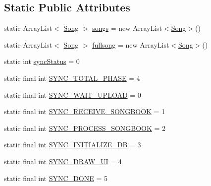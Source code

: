 \subsection*{\-Static \-Public \-Attributes}
\begin{DoxyCompactItemize}
\item 
static \-Array\-List$<$ \hyperlink{classcom_1_1axcoto_1_1shinjuku_1_1maki_1_1_song}{\-Song} $>$ \hyperlink{classcom_1_1axcoto_1_1shinjuku_1_1sushi_1_1_song_activity_a2bc7138b54f5cc324ab4484a1b5a93a3}{songs} = new \-Array\-List$<$\hyperlink{classcom_1_1axcoto_1_1shinjuku_1_1maki_1_1_song}{\-Song}$>$()
\item 
static \-Array\-List$<$ \hyperlink{classcom_1_1axcoto_1_1shinjuku_1_1maki_1_1_song}{\-Song} $>$ \hyperlink{classcom_1_1axcoto_1_1shinjuku_1_1sushi_1_1_song_activity_adb36917a258a28234772eb50476fffde}{fullsong} = new \-Array\-List$<$\hyperlink{classcom_1_1axcoto_1_1shinjuku_1_1maki_1_1_song}{\-Song}$>$()
\item 
static int \hyperlink{classcom_1_1axcoto_1_1shinjuku_1_1sushi_1_1_song_activity_a9cc4d49086de820c00b3ce396cbb42b3}{sync\-Status} = 0
\item 
static final int \hyperlink{classcom_1_1axcoto_1_1shinjuku_1_1sushi_1_1_song_activity_aba0067d5d9c1dc96d37562ff1886677a}{\-S\-Y\-N\-C\-\_\-\-T\-O\-T\-A\-L\-\_\-\-P\-H\-A\-S\-E} = 4
\item 
static final int \hyperlink{classcom_1_1axcoto_1_1shinjuku_1_1sushi_1_1_song_activity_a6b8cab47f0a4808112b3adaa0105ab81}{\-S\-Y\-N\-C\-\_\-\-W\-A\-I\-T\-\_\-\-U\-P\-L\-O\-A\-D} = 0
\item 
static final int \hyperlink{classcom_1_1axcoto_1_1shinjuku_1_1sushi_1_1_song_activity_a2b130714fb3ca4d760857e63644ae40f}{\-S\-Y\-N\-C\-\_\-\-R\-E\-C\-E\-I\-V\-E\-\_\-\-S\-O\-N\-G\-B\-O\-O\-K} = 1
\item 
static final int \hyperlink{classcom_1_1axcoto_1_1shinjuku_1_1sushi_1_1_song_activity_a7f89a4f96cbb266d97ac9165b2baea03}{\-S\-Y\-N\-C\-\_\-\-P\-R\-O\-C\-E\-S\-S\-\_\-\-S\-O\-N\-G\-B\-O\-O\-K} = 2
\item 
static final int \hyperlink{classcom_1_1axcoto_1_1shinjuku_1_1sushi_1_1_song_activity_a92406fdebd7cef4a4e027efed690fc70}{\-S\-Y\-N\-C\-\_\-\-I\-N\-I\-T\-I\-A\-L\-I\-Z\-E\-\_\-\-D\-B} = 3
\item 
static final int \hyperlink{classcom_1_1axcoto_1_1shinjuku_1_1sushi_1_1_song_activity_a5b1c352e946a1ae9c3818b73ce406e67}{\-S\-Y\-N\-C\-\_\-\-D\-R\-A\-W\-\_\-\-U\-I} = 4
\item 
static final int \hyperlink{classcom_1_1axcoto_1_1shinjuku_1_1sushi_1_1_song_activity_a5e6dcaf1d008eced644b33fe29d03657}{\-S\-Y\-N\-C\-\_\-\-D\-O\-N\-E} = 5

\end{DoxyCompactItemize}
